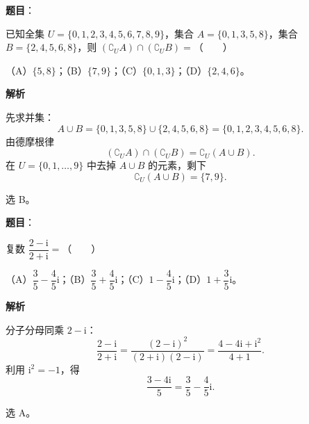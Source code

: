 

\begin{answer}

\textbf{题目}：

已知全集 $U=\{0,1,2,3,4,5,6,7,8,9\}$，集合 $A=\{0,1,3,5,8\}$，集合 $B=\{2,4,5,6,8\}$，则 $(\complement_U A)\cap(\complement_U B)=$\mbox{（　　）}

（A）$\{5,8\}$；（B）$\{7,9\}$；（C）$\{0,1,3\}$；（D）$\{2,4,6\}$。

\textbf{解析}

先求并集：
\nopagebreak[4]
\[A\cup B=\{0,1,3,5,8\}\cup\{2,4,5,6,8\}=\{0,1,2,3,4,5,6,8\}.\]
由德摩根律
\nopagebreak[4]
\[(\complement_U A)\cap(\complement_U B)=\complement_U(A\cup B).\]
在 $U=\{0,1,\ldots,9\}$ 中去掉 $A\cup B$ 的元素，剩下
\nopagebreak[4]
\[\complement_U(A\cup B)=\{7,9\}.\]

选 B。


\end{answer}
\begin{answer}

\textbf{题目}：

复数 $\dfrac{2-\mathrm i}{2+\mathrm i}=$\mbox{（　　）}

（A）$\dfrac35-\dfrac45\mathrm i$；（B）$\dfrac35+\dfrac45\mathrm i$；（C）$1-\dfrac45\mathrm i$；（D）$1+\dfrac35\mathrm i$。

\textbf{解析}

分子分母同乘 $2-\mathrm i$：
\nopagebreak[4]
\[\frac{2-\mathrm i}{2+\mathrm i}
=\frac{(2-\mathrm i)^2}{(2+\mathrm i)(2-\mathrm i)}
=\frac{4-4\mathrm i+\mathrm i^2}{4+1}.\]
利用 $\mathrm i^2=-1$，得
\nopagebreak[4]
\[\frac{3-4\mathrm i}{5}=\frac35-\frac45\mathrm i.\]

选 A。


\end{answer}
